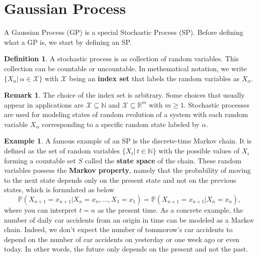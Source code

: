 \documentclass[10pt]{article}
\theoremstyle{definition}
\newtheorem{defn}{Definition}[section]
\newtheorem{exmp}{Example}[section]
\newtheorem*{rem}{Remark}
\begin{document}
\section{Gaussian Process}
 A Gaussian Process (GP) is a special Stochastic Process (SP). Before defining what a GP is, we start by defining an SP.
 \begin{defn}
 A stochastic process is as collection of random variables. This collection can be countable or uncountable. In methematical notation, we write $\{X_{\alpha}|\,\alpha\in \mathcal{X}\}$ with $\mathcal{X}$ being an \textbf{index set} that labels the random variables as $X_{\alpha}$.
 \end{defn}
 \begin{rem}
The choice of the index set is arbitrary. Some choices that usually appear in applications are $\mathcal{X}\subseteq\mathbb{N}$ and $\mathcal{X}\subseteq\mathbb{R}^{m}$ with $m \ge 1$. Stochastic processes are used for modeling states of random evolution of a system with each random variable $X_{\alpha}$ corresponding to a specific random state labeled by $\alpha$.
 \end{rem}
 \begin{exmp}
 A famous example of an SP is the discrete-time Markov chain. It is defined as the set of random variables $\{X_t|\,t\in\mathbb{N}\}$ with the possible values of $X_i$ forming a countable set $S$ called the \textbf{state space} of the chain. These random variables possess the \textbf{Markov property}, namely that the probability of moving to the next state depends only on the present state and not on the previous states, which is formulated as below
 \begin{equation*}
 \mathbb{P}(X_{n+1} = x_{n+1} | X_{n} = x_{n},\dots,X_{1} = x_{1}) =  \mathbb{P}(X_{n+1} = x_{n+1}|X_{n} = x_{n}),
 \end{equation*}
 where you can interpret $t=n$ as the present time. As a concrete example, the number of daily car accidents from an origin in time can be modeled as a Markov chain. Indeed, we don't expect the number of tommorow's car accidents to depend on the number of car accidents on yesterday or one week ago or even today. In other words, the future only depends on the present and not the past.
 \end{exmp}
 
\end{document}
